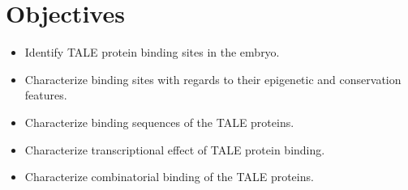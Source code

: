 \chapter{Objectives}
\label{chp:discussion}

\begin{itemize}

  \item Identify TALE protein binding sites in the embryo.
  
  \item Characterize binding sites with regards to their epigenetic and conservation features.
  
  \item Characterize binding sequences of the TALE proteins.
  
  \item Characterize transcriptional effect of TALE protein binding.
  
  \item Characterize combinatorial binding of the TALE proteins.
  
\end{itemize}